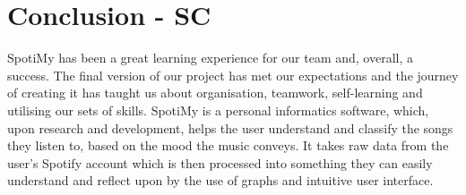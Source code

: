 \documentclass[10pt, notitlepage]{report}
\begin{document}

\chapter{Conclusion  - SC}

SpotiMy has been a great learning experience for our team and, overall, a success. The final version of our project has met our expectations and the journey of creating it has taught us about organisation, teamwork, self-learning and utilising our sets of skills. SpotiMy is a personal informatics software, which, upon research and development, helps the user understand and classify the songs they listen to, based on the mood the music conveys. It takes raw data from the user’s Spotify account which is then processed into something they can easily understand and reflect upon by the use of graphs and intuitive user interface. 
\end{document}
